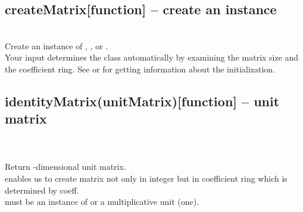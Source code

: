  \subsection{createMatrix[function] -- create an instance}
  \\
   \spacing
   \quad Create an instance of , ,  or .\\
   \spacing
   \quad Your input determines the class automatically by examining the matrix size and the coefficient ring.
   See  or  for getting information about the initialization.\\
   \spacing
 \subsection{identityMatrix(unitMatrix)[function] -- unit matrix}
  \\
    \\
   \spacing
   \quad Return -dimensional unit matrix.\\
   \spacing
   \quad {} enables us to create matrix not only in integer but in coefficient ring which is determined by coeff. \\
   \spacing
     must be an instance of  or a multiplicative unit (one).
